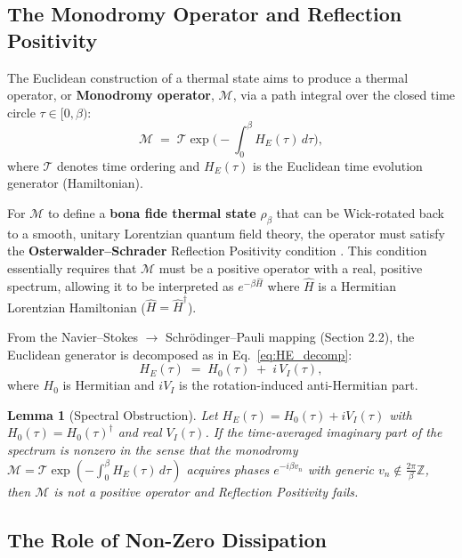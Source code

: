 \documentclass[11pt]{article}
\newtheorem{lemma}{Lemma}
\begin{document}
\subsection{The Monodromy Operator and Reflection Positivity}
\label{subsec:monodromy-rp}

The Euclidean construction of a thermal state aims to produce a thermal operator, or \textbf{Monodromy operator}, $\mathcal{M}$, via a path integral over the closed time circle $\tau \in [0, \beta)$:
\begin{equation}\label{eq:monodromy_def}
    \mathcal M \;=\; \mathcal T\exp\Big(-\int_0^\beta H_E(\tau)\,d\tau\Big),
\end{equation}
where $\mathcal T$ denotes time ordering and $H_E(\tau)$ is the Euclidean time evolution generator (Hamiltonian).

For $\mathcal{M}$ to define a \textbf{bona fide thermal state} $\rho_\beta$ that can be Wick-rotated back to a smooth, unitary Lorentzian quantum field theory, the operator must satisfy the \textbf{Osterwalder--Schrader} Reflection Positivity condition \cite{OsterwalderSchrader1973}. This condition essentially requires that $\mathcal{M}$ must be a positive operator with a real, positive spectrum, allowing it to be interpreted as $e^{-\beta \widehat{H}}$ where $\widehat{H}$ is a Hermitian Lorentzian Hamiltonian ($\widehat{H} = \widehat{H}^\dagger$).

From the Navier--Stokes $\to$ Schr\"odinger--Pauli mapping (Section 2.2), 
   the Euclidean generator is decomposed as in Eq.~\eqref{eq:HE_decomp}:
   \begin{equation}
       H_E(\tau) \;=\; H_0(\tau) \;+\; i\,V_I(\tau),
   \end{equation}
   where $H_0$ is Hermitian and $iV_I$ is the rotation-induced anti-Hermitian part.

\begin{lemma}[Spectral Obstruction]\label{lem:spectral-obstruction}
Let $H_E(\tau)=H_0(\tau)+iV_I(\tau)$ with $H_0(\tau)=H_0(\tau)^\dagger$ and real $V_I(\tau)$.
If the time-averaged imaginary part of the spectrum is nonzero in the sense that the monodromy
$\mathcal{M}=\mathcal{T}\exp\!\left(-\int_0^\beta H_E(\tau)\,d\tau\right)$ acquires phases
$e^{-i\beta v_n}$ with generic $v_n\notin\frac{2\pi}{\beta}\mathbb{Z}$, then $\mathcal{M}$ is not a
positive operator and Reflection Positivity fails.
\end{lemma}

\subsection{The Role of Non-Zero Dissipation}
\end{document}
